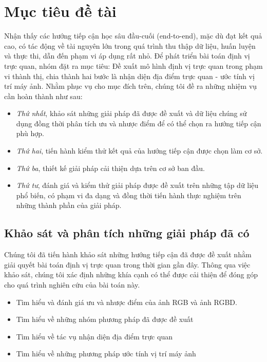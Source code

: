 \section{Mục tiêu đề tài}

Nhận thấy các hướng tiếp cận học sâu đầu-cuối (end-to-end), mặc dù đạt kết quả cao, có tác động về tài nguyên lớn trong quá trình thu thập dữ liệu, huấn luyện và thực thi, dẫn đến phạm vi áp dụng rất nhỏ. Để phát triển bài toán định vị trực quan, nhóm đặt ra mục tiêu: Đề xuất mô hình định vị trực quan trong phạm vi thành thị, chia thành hai bước là nhận diện địa điểm trực quan - ước tính vị trí máy ảnh. Nhằm phục vụ cho mục đích trên, chúng tôi đề ra những nhiệm vụ cần hoàn thành như sau:

\begin{itemize}
    \item \textit{Thứ nhất}, khảo sát những giải pháp đã được đề xuất và dữ liệu chúng sử dụng đồng thời phân tích ưu và nhược điểm để có thể chọn ra hướng tiếp cận phù hợp.
    \item \textit{Thứ hai}, tiến hành kiểm thử kết quả của hướng tiếp cận được chọn làm cơ sở.
    \item \textit{Thứ ba}, thiết kế giải pháp cải thiện dựa trên cơ sở ban đầu.
    \item \textit{Thứ tư}, đánh giá và kiểm thử giải pháp được đề xuất trên những tập dữ liệu phổ biến, có phạm vi đa dạng và đồng thời tiến hành thực nghiệm trên những thành phần của giải pháp.
\end{itemize}

\newpage
\subsection{Khảo sát và phân tích những giải pháp đã có}

Chúng tôi đã tiến hành khảo sát những hướng tiếp cận đã được đề xuất nhằm giải quyết bài toán định vị trực quan trong thời gian gần đây. Thông qua việc khảo sát, chúng tôi xác định những khía cạnh có thể được cải thiện để đóng góp cho quá trình nghiên cứu của bài toán này.
\begin{itemize}
    \item Tìm hiểu và đánh giá ưu và nhược điểm của ảnh RGB và ảnh RGBD.
    \item Tìm hiểu về những nhóm phương pháp đã được đề xuất
    \item Tìm hiểu về tác vụ nhận diện địa điểm trực quan
    \item Tìm hiểu về những phương pháp ước tính vị trí máy ảnh
\end{itemize}

